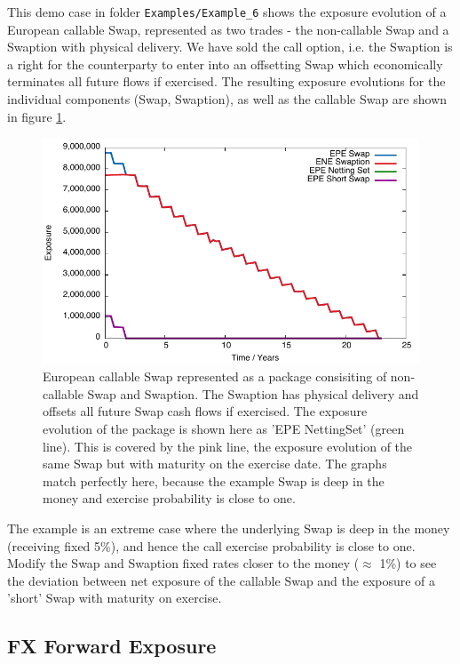 \documentclass[12pt, a4paper]{article}
\begin{document}
This demo case in folder {\tt Examples/Example\_6} shows the exposure evolution of a European callable Swap, represented as two trades - the non-callable Swap and a Swaption with physical delivery. We have sold the call option, i.e. the Swaption is a right for the counterparty to enter into an offsetting Swap which economically terminates all future flows if exercised. The resulting exposure evolutions for the individual components (Swap, Swaption), as well as the callable Swap are shown in figure \ref{fig_4}. 
\begin{figure}[hbt]
\begin{center}
\includegraphics[scale=1.0]{example_callable_swap.pdf}
\end{center}
\caption{European callable Swap represented as a package consisiting of non-callable Swap and Swaption. The Swaption has physical delivery and offsets all future Swap cash flows if exercised. The exposure evolution of the package is shown here as 'EPE NettingSet' (green line). This is covered by the pink line, the exposure evolution of the same Swap but with maturity on the exercise date. The graphs match perfectly here, because the example Swap is deep in the money and exercise probability is close to one. }
\label{fig_4}
\end{figure}
The example is an extreme case where the underlying Swap is deep in the money (receiving fixed 5\%), and hence the call exercise probability is close to one. Modify the Swap and Swaption fixed rates closer to the money ($\approx$ 1\%) to see the deviation between net exposure of the callable Swap and the exposure of a 'short' Swap with maturity on exercise.  

\subsection{FX Forward Exposure}\label{sec:fxfwd}
\end{document}
